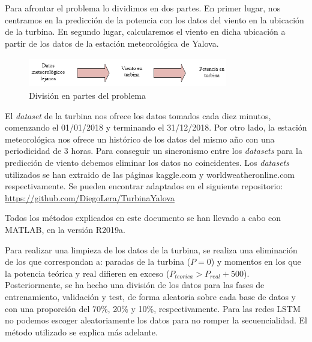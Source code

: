 \documentclass[journal]{IEEEtran}
\begin{document}
Para afrontar el problema lo dividimos en dos partes. En primer lugar, nos centramos en la predicción de la potencia con los datos del viento en la ubicación de la turbina. En segundo lugar, calcularemos el viento en dicha ubicación a partir de los datos de la estación meteorológica de Yalova. 
   \begin{figure}[!ht]
        \centering
        \includegraphics[width=8.7cm, height=1.3cm]{In-Out.png}
        \captionsetup{justification=centering,singlelinecheck=false}
        \caption{División en partes del problema}
        \label{fig:splines}
    \end{figure}

El \emph{dataset} de la turbina nos ofrece los datos tomados cada diez minutos, comenzando el 01/01/2018 y terminando el 31/12/2018.  Por otro lado, la estación meteorológica nos ofrece un histórico de los datos del mismo año con una periodicidad de 3 horas. Para conseguir un sincronismo entre los \emph{datasets} para la predicción de viento debemos eliminar los datos no coincidentes. 
Los \emph{datasets} utilizados se han extraido de las páginas kaggle.com y worldweatheronline.com respectivamente. Se pueden encontrar adaptados en el siguiente repositorio: \url{https://github.com/DiegoLera/TurbinaYalova}

Todos los métodos explicados en este documento se han llevado a cabo con MATLAB, en la versión R2019a.

Para realizar una limpieza de los datos de la turbina, se realiza una eliminación de los que correspondan a: paradas de la turbina ($P=0$) y momentos en los que la potencia teórica y real difieren en exceso ($P_{teorica}>P_{real}+500$).
Posteriormente, se ha hecho una división de los datos para las fases de entrenamiento, validación y test, de forma aleatoria sobre cada base de datos y con una proporción del 70\%, 20\% y 10\%, respectivamente. Para las redes LSTM no podemos escoger aleatoriamente los datos para no romper la secuencialidad. El método utilizado se explica más adelante.
\end{document}
